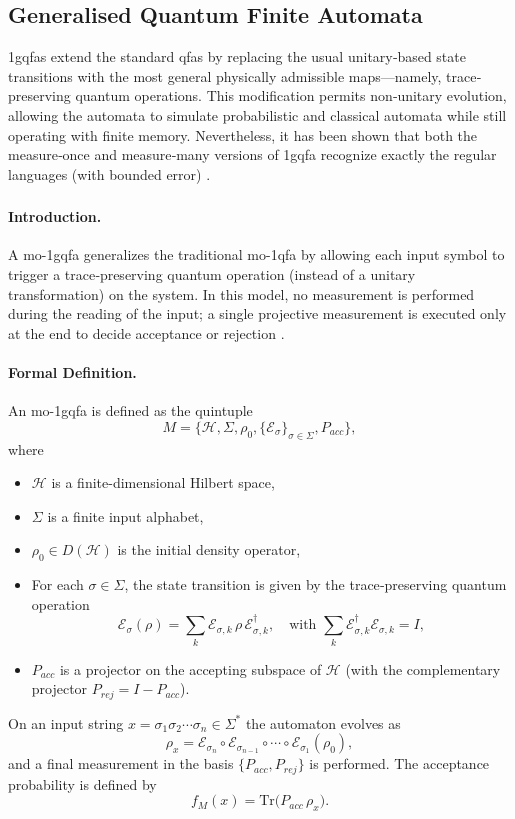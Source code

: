 \subsection{Generalised Quantum Finite Automata}
\label{sec:generalised-qfa}
\glspl{1gqfa} extend the standard \glspl{qfa} by replacing the usual unitary‐based state transitions with the most general physically admissible maps—namely, trace‐preserving quantum operations. This modification permits non‐unitary evolution, allowing the automata to simulate probabilistic and classical automata while still operating with finite memory. Nevertheless, it has been shown that both the measure‐once and measure‐many versions of \gls{1gqfa} recognize exactly the regular languages (with bounded error) \cite{LI201273}.

\subsubsection{}
\paragraph{Introduction.}  
A \gls{mo-1gqfa} generalizes the traditional \gls{mo-1qfa} by allowing each input symbol to trigger a trace‐preserving quantum operation (instead of a unitary transformation) on the system. In this model, no measurement is performed during the reading of the input; a single projective measurement is executed only at the end to decide acceptance or rejection \cite{LI201273}.

\paragraph{Formal Definition.}  
An \gls{mo-1gqfa} is defined as the quintuple
\[
M = \{ \mathcal{H},\Sigma,\rho_0,\{\mathcal{E}_\sigma\}_{\sigma\in\Sigma},P_{acc}\},
\]
where
\begin{itemize}
  \item $\mathcal{H}$ is a finite-dimensional Hilbert space,
  \item $\Sigma$ is a finite input alphabet,
  \item $\rho_0\in D(\mathcal{H})$ is the initial density operator,
  \item For each $\sigma\in\Sigma$, the state transition is given by the trace‐preserving quantum operation 
  \[
  \mathcal{E}_\sigma(\rho)=\sum_{k} \mathcal{E}_{\sigma,k}\,\rho\,\mathcal{E}_{\sigma,k}^\dagger,\quad \text{with } \sum_{k} \mathcal{E}_{\sigma,k}^\dagger \mathcal{E}_{\sigma,k}=I,
  \]
  \item $P_{acc}$ is a projector on the accepting subspace of $\mathcal{H}$ (with the complementary projector $P_{rej}=I-P_{acc}$).
\end{itemize}
On an input string $x=\sigma_1\sigma_2\cdots\sigma_n\in\Sigma^*$ the automaton evolves as
\[
\rho_x = \mathcal{E}_{\sigma_n}\circ \mathcal{E}_{\sigma_{n-1}}\circ\cdots\circ \mathcal{E}_{\sigma_1}(\rho_0),
\]
and a final measurement in the basis $\{P_{acc},P_{rej}\}$ is performed. The acceptance probability is defined by
\[
f_M(x)=\mathrm{Tr}\bigl(P_{acc}\,\rho_x\bigr).
\]

